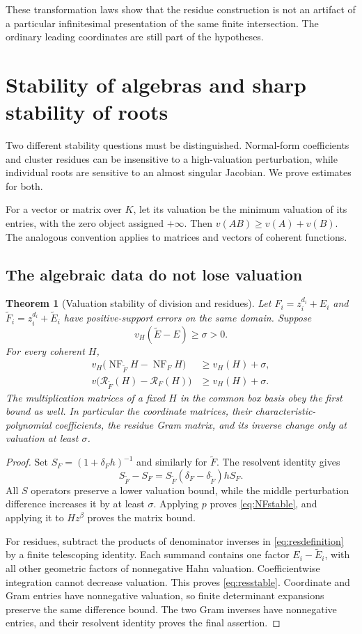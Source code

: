 \documentclass[11pt,letterpaper]{article}
\newtheorem{theorem}{Theorem}[section]
\theoremstyle{definition}
\theoremstyle{remark}
\newcommand{\RR}{\mathscr R}
\newcommand{\NF}{\operatorname{NF}}
\numberwithin{equation}{section}
\begin{document}
These transformation laws show that the residue construction is not an artifact of a particular infinitesimal presentation of the same finite intersection. The ordinary leading coordinates are still part of the hypotheses.

\section{Stability of algebras and sharp stability of roots}\label{sec:stability}
Two different stability questions must be distinguished. Normal-form coefficients and cluster residues can be insensitive to a high-valuation perturbation, while individual roots are sensitive to an almost singular Jacobian. We prove estimates for both.

For a vector or matrix over $K$, let its valuation be the minimum valuation of its entries, with the zero object assigned $+\infty$. Then $v(AB)\ge v(A)+v(B)$. The analogous convention applies to matrices and vectors of coherent functions.

\subsection{The algebraic data do not lose valuation}
\begin{theorem}[Valuation stability of division and residues]\label{thm:algebrastability}
Let $F_i=z_i^{d_i}+E_i$ and $\widetilde F_i=z_i^{d_i}+\widetilde E_i$ have positive-support errors on the same domain. Suppose
\[
 v_H(\widetilde E-E)\ge\sigma>0.
\]
For every coherent $H$,
\begin{align}
 v_H\bigl(\NF_{\widetilde F}H-\NF_FH\bigr)&\ge v_H(H)+\sigma,\label{eq:NFstable}\\
 v\bigl(\RR_{\widetilde F}(H)-\RR_F(H)\bigr)&\ge v_H(H)+\sigma.
 \label{eq:resstable}
\end{align}
The multiplication matrices of a fixed $H$ in the common box basis obey the first bound as well. In particular the coordinate matrices, their characteristic-polynomial coefficients, the residue Gram matrix, and its inverse change only at valuation at least $\sigma$.
\end{theorem}
\begin{proof}
Set $S_F=(1+\delta_Fh)^{-1}$ and similarly for $\widetilde F$. The resolvent identity gives
\[
 S_{\widetilde F}-S_F
 =S_{\widetilde F}(\delta_F-\delta_{\widetilde F})hS_F.
\]
All $S$ operators preserve a lower valuation bound, while the middle perturbation difference increases it by at least $\sigma$. Applying $p$ proves \eqref{eq:NFstable}, and applying it to $Hz^\beta$ proves the matrix bound.

For residues, subtract the products of denominator inverses in \eqref{eq:resdefinition} by a finite telescoping identity. Each summand contains one factor $E_i-\widetilde E_i$, with all other geometric factors of nonnegative Hahn valuation. Coefficientwise integration cannot decrease valuation. This proves \eqref{eq:resstable}. Coordinate and Gram entries have nonnegative valuation, so finite determinant expansions preserve the same difference bound. The two Gram inverses have nonnegative entries, and their resolvent identity proves the final assertion.
\end{proof}
\end{document}
